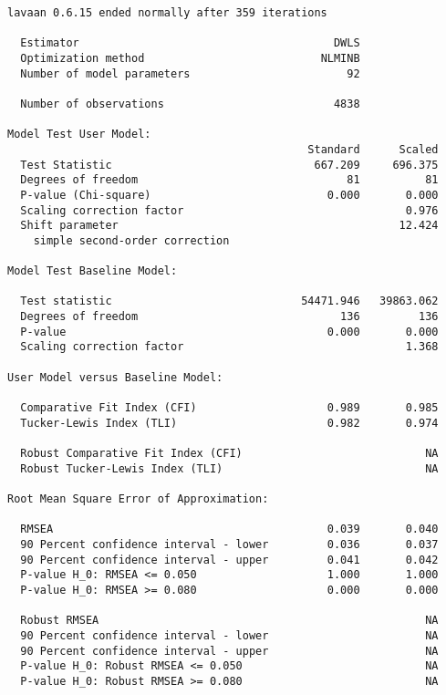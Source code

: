 \documentclass[
]{article}
\begin{document}
\begin{verbatim}
lavaan 0.6.15 ended normally after 359 iterations

  Estimator                                       DWLS
  Optimization method                           NLMINB
  Number of model parameters                        92

  Number of observations                          4838

Model Test User Model:
                                              Standard      Scaled
  Test Statistic                               667.209     696.375
  Degrees of freedom                                81          81
  P-value (Chi-square)                           0.000       0.000
  Scaling correction factor                                  0.976
  Shift parameter                                           12.424
    simple second-order correction                                

Model Test Baseline Model:

  Test statistic                             54471.946   39863.062
  Degrees of freedom                               136         136
  P-value                                        0.000       0.000
  Scaling correction factor                                  1.368

User Model versus Baseline Model:

  Comparative Fit Index (CFI)                    0.989       0.985
  Tucker-Lewis Index (TLI)                       0.982       0.974
                                                                  
  Robust Comparative Fit Index (CFI)                            NA
  Robust Tucker-Lewis Index (TLI)                               NA

Root Mean Square Error of Approximation:

  RMSEA                                          0.039       0.040
  90 Percent confidence interval - lower         0.036       0.037
  90 Percent confidence interval - upper         0.041       0.042
  P-value H_0: RMSEA <= 0.050                    1.000       1.000
  P-value H_0: RMSEA >= 0.080                    0.000       0.000
                                                                  
  Robust RMSEA                                                  NA
  90 Percent confidence interval - lower                        NA
  90 Percent confidence interval - upper                        NA
  P-value H_0: Robust RMSEA <= 0.050                            NA
  P-value H_0: Robust RMSEA >= 0.080                            NA


\end{verbatim}
\end{document}
